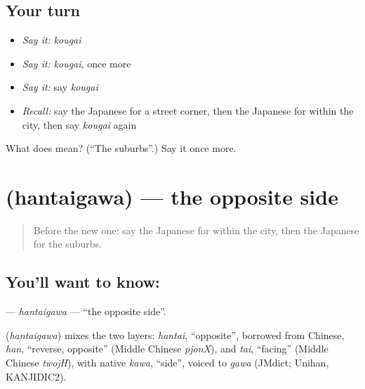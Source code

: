 \subsection*{Your turn}
\begin{itemize}
\raggedright
  \item \emph{Say it:} \emph{kougai}
  \item \emph{Say it:} \emph{kougai}, once more
  \item \emph{Say it:} say \emph{kougai}
  \item \emph{Recall:} say the Japanese for a street corner, then the Japanese for within the city, then say \emph{kougai} again
\end{itemize}

\begin{tcolorbox}[breakable,colback=teal!4,colframe=teal!35!black,title={Before you move on}]
What does  mean? (\textquotedblleft{}The suburbs\textquotedblright{}.) Say it once more.
\end{tcolorbox}
\section[\texorpdfstring{\ja{はんたいがわ} (hantaigawa)}{はんたいがわ (hantaigawa)}]{ (hantaigawa) — the opposite side}

\label{lesson:JA-C82-hantaigawa}



\begin{quote}
Before the new one: say the Japanese for within the city, then the Japanese for the suburbs.
\end{quote}

\subsection*{You'll want to know: }
\textbf{} — \emph{hantaigawa} — \textquotedblleft{}the opposite side\textquotedblright{}.

\begin{cousinweb}
\textbf{} (\emph{hantaigawa}) mixes the two layers: \emph{hantai}, \textquotedblleft{}opposite\textquotedblright{}, borrowed from Chinese, \emph{han}, \textquotedblleft{}reverse, opposite\textquotedblright{} (Middle Chinese \emph{pjonX}), and \emph{tai}, \textquotedblleft{}facing\textquotedblright{} (Middle Chinese \emph{twojH}), with native \emph{kawa}, \textquotedblleft{}side\textquotedblright{}, voiced to \emph{gawa} (JMdict; Unihan, KANJIDIC2).
\end{cousinweb}

